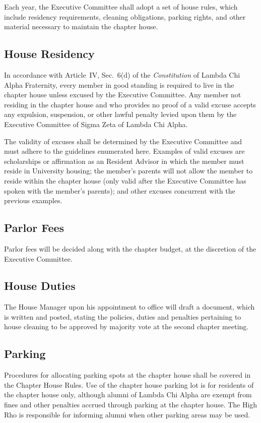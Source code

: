 \documentclass{article}
\begin{document}
Each year, the Executive Committee shall adopt a set of house rules, which
include residency requirements, cleaning obligations, parking rights, and other
material necessary to maintain the chapter house.

\subsection{House Residency}

In accordance with Article~IV, Sec.~6(d) of the \emph{Constitution} of Lambda
Chi Alpha Fraternity, every member in good standing is required to live in the
chapter house unless excused by the Executive Committee. Any member not residing
in the chapter house and who provides no proof of a valid excuse accepts any
expulsion, suspension, or other lawful penalty levied upon them by the Executive
Committee of Sigma Zeta of Lambda Chi Alpha.

The validity of excuses shall be determined by the Executive Committee and must
adhere to the guidelines enumerated here. Examples of valid excuses are
scholarships or affirmation as an Resident Advisor in which the member must
reside in University housing; the member’s parents will not allow the member to
reside within the chapter house (only valid after the Executive Committee has
spoken with the member’s parents); and other excuses concurrent with the
previous examples.

\subsection{Parlor Fees}

Parlor fees will be decided along with the chapter budget, at the discretion of
the Executive Committee.

\subsection{House Duties}

The House Manager upon his appointment to office will draft a document, which is
written and posted, stating the policies, duties and penalties pertaining to
house cleaning to be approved by majority vote at the second chapter meeting.

\subsection{Parking}

Procedures for allocating parking spots at the chapter house shall be covered in
the Chapter House Rules. Use of the chapter house parking lot is for residents
of the chapter house only, although alumni of Lambda Chi Alpha are exempt from
fines and other penalties accrued through parking at the chapter house. The High
Rho is responsible for informing alumni when other parking areas may be used.
\end{document}

